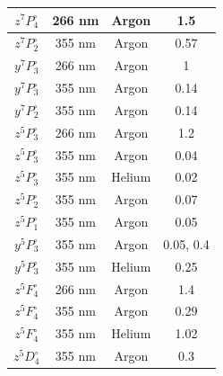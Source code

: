 \documentclass[12pt,twoside]{reedthesis}
\begin{document}
\begin{longtable}{||c|c|c|c||}
	$z^{7}P^{\circ}_{4}$ & 266 nm           & Argon      & 1.5                                                       \\\hline
	$z^{7}P^{\circ}_{2}$ & 355 nm           & Argon      & 0.57                                                      \\\hline
	$y^{7}P^{\circ}_{3}$ & 266 nm           & Argon      & 1                                                         \\\hline
	$y^{7}P^{\circ}_{3}$ & 355 nm           & Argon      & 0.14                                                      \\\hline
	$y^{7}P^{\circ}_{2}$ & 355 nm           & Argon      & 0.14                                                      \\\hline
	$z^{5}P^{\circ}_{3}$ & 266 nm           & Argon      & 1.2                                                       \\\hline
	$z^{5}P^{\circ}_{3}$ & 355 nm           & Argon      & 0.04                                                      \\\hline
	$z^{5}P^{\circ}_{3}$ & 355 nm           & Helium     & 0.02                                                      \\\hline
	$z^{5}P^{\circ}_{2}$ & 355 nm           & Argon      & 0.07                                                      \\\hline
	$z^{5}P^{\circ}_{1}$ & 355 nm           & Argon      & 0.05                                                      \\\hline
	$y^{5}P^{\circ}_{3}$ & 355 nm           & Argon      & 0.05, 0.4                                                 \\\hline
	$y^{5}P^{\circ}_{3}$ & 355 nm           & Helium     & 0.25                                                      \\\hline
	$z^{5}F^{\circ}_{4}$ & 266 nm           & Argon      & 1.4                                                       \\\hline
	$z^{5}F^{\circ}_{4}$ & 355 nm           & Argon      & 0.29                                                      \\\hline
	$z^{5}F^{\circ}_{4}$ & 355 nm           & Helium     & 1.02                                                      \\\hline
	$z^{5}D^{\circ}_{4}$ & 355 nm           & Argon      & 0.3                                                       \\\hline

\end{longtable}
\end{document}
